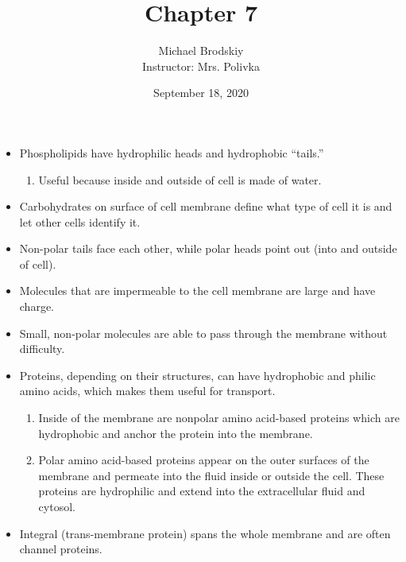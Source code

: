 \documentclass[12pt]{article}
\title{Chapter 7}
\date{September 18, 2020}
\author{Michael Brodskiy\\ \small Instructor: Mrs. Polivka}
\begin{document}
\maketitle

\begin{itemize}

  \item Phospholipids have hydrophilic heads and hydrophobic “tails.”

    \begin{enumerate}

      \item Useful because inside and outside of cell is made of water.

    \end{enumerate}

  \item Carbohydrates on surface of cell membrane define what type of cell it is and let other cells identify it.

  \item Non-polar tails face each other, while polar heads point out (into and outside of cell). 

  \item Molecules that are impermeable to the cell membrane are large and have charge.

  \item Small, non-polar molecules are able to pass through the membrane without difficulty.

  \item Proteins, depending on their structures, can have hydrophobic and philic amino acids, which makes them useful for transport.

    \begin{enumerate}

      \item Inside of the membrane are nonpolar amino acid-based proteins which are hydrophobic and anchor the protein into the membrane.

      \item Polar amino acid-based proteins appear on the outer surfaces of the membrane and permeate into the fluid inside or outside the cell. These proteins are hydrophilic and extend into the extracellular fluid and cytosol.

    \end{enumerate}

  \item Integral (trans-membrane protein) spans the whole membrane and are often channel proteins.


\end{itemize}
\end{document}
